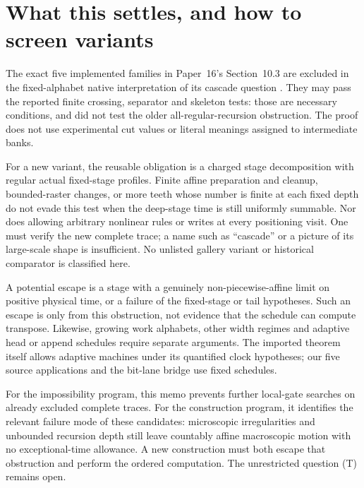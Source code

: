 \section{What this settles, and how to screen variants}
\label{sec:scope}

The exact five implemented families in Paper~16's Section~10.3 are excluded
in the fixed-alphabet native interpretation of its cascade question
\cite[Problem~11.4]{SixteenthPaper2026}. They may pass the reported finite
crossing, separator and skeleton tests: those are necessary conditions,
and did not test the older all-regular-recursion obstruction. The proof
does not use experimental cut values or literal meanings assigned to
intermediate banks.

For a new variant, the reusable obligation is a charged stage decomposition
with regular actual fixed-stage profiles. Finite affine preparation and
cleanup, bounded-raster changes, or more teeth whose number is finite at
each fixed depth do not evade this test when the deep-stage time is still
uniformly summable. Nor does allowing arbitrary nonlinear rules or writes
at every positioning visit. One must verify the new complete trace; a name
such as ``cascade'' or a picture of its large-scale shape is insufficient.
No unlisted gallery variant or historical comparator is classified here.

A potential escape is a stage with a genuinely non-piecewise-affine limit
on positive physical time, or a failure of the fixed-stage or tail
hypotheses. Such an escape is only from this obstruction, not evidence
that the schedule can compute transpose. Likewise, growing work alphabets,
other width regimes and adaptive head or append schedules require separate
arguments. The imported theorem itself allows adaptive machines under
its quantified clock hypotheses; our five source applications and the
bit-lane bridge use fixed schedules.

For the impossibility program, this memo prevents further local-gate
searches on already excluded complete traces. For the construction program,
it identifies the relevant failure mode of these candidates: microscopic
irregularities and unbounded recursion depth still leave countably affine
macroscopic motion with no exceptional-time allowance. A new construction
must both escape that obstruction and perform the ordered computation.
The unrestricted question (T) remains open.
